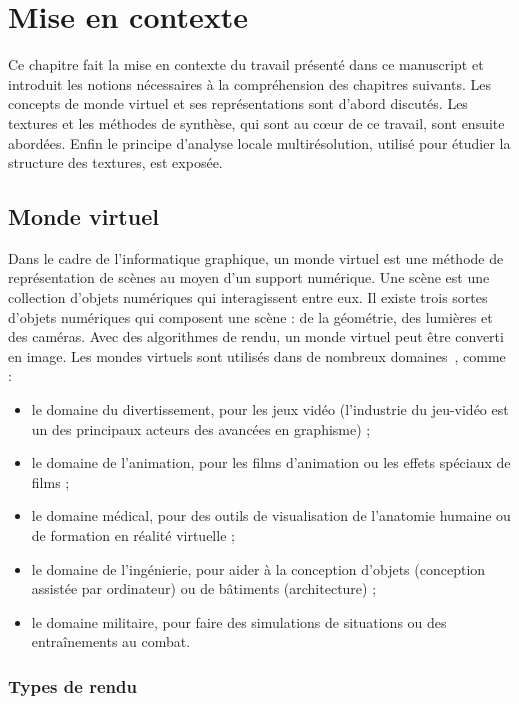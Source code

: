 \chapter{Mise en contexte}
\label{ch:chapitre0}

Ce chapitre fait la mise en contexte du travail présenté dans ce manuscript et introduit les notions nécessaires à la compréhension des chapitres suivants. Les concepts de monde virtuel et ses représentations sont d'abord discutés. Les textures et les méthodes de synthèse, qui sont au cœur de ce travail, sont ensuite abordées. Enfin le principe d'analyse locale multirésolution, utilisé pour étudier la structure des textures, est exposée.

\section{Monde virtuel}

Dans le cadre de l'informatique graphique, un monde virtuel est une méthode de représentation de scènes au moyen d'un support numérique. Une scène est une collection d'objets numériques qui interagissent entre eux. Il existe trois sortes d'objets numériques qui composent une scène : de la géométrie, des lumières et des caméras. Avec des algorithmes de rendu, un monde virtuel peut être converti en image. Les mondes virtuels sont utilisés dans de nombreux domaines~\cite{magnenat-thalmann_introduction_1986}, comme :

\begin{itemize}
    \item le domaine du divertissement, pour les jeux vidéo (l'industrie du jeu-vidéo est un des principaux acteurs des avancées en graphisme) ;
    \item le domaine de l'animation, pour les films d'animation ou les effets spéciaux de films ;
    \item le domaine médical, pour des outils de visualisation de l'anatomie humaine ou de formation en réalité virtuelle ;
    \item le domaine de l'ingénierie, pour aider à la conception d'objets (conception assistée par ordinateur) ou de bâtiments (architecture) ;
    \item le domaine militaire, pour faire des simulations de situations ou des entraînements au combat.
\end{itemize}

\subsection{Types de rendu}

